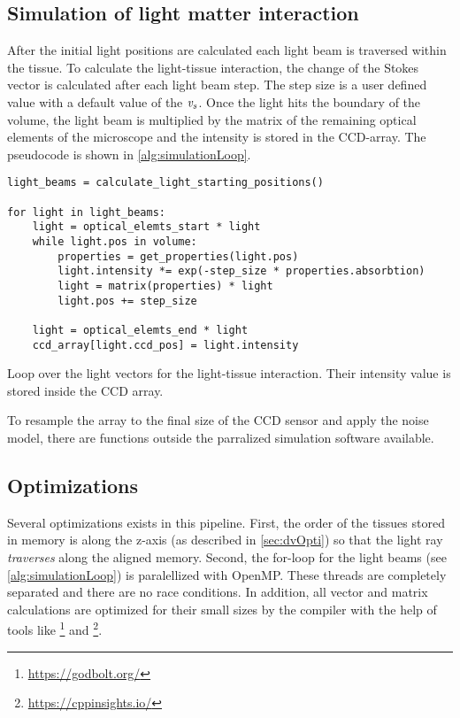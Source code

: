 \subsection{Simulation of light matter interaction}\label{sec:simLightTissue}
%
After the initial light positions are calculated each light beam is traversed within the tissue.
To calculate the light-tissue interaction, the change of the Stokes vector is calculated after each light beam step.
The step size is a user defined value with a default value of the \Voxelsize{} $\textnormal{$\mathit{v_{s}}$}$.
Once the light hits the boundary of the volume, the light beam is multiplied by the matrix of the remaining optical elements of the microscope and the intensity is stored in the \ac{CCD}-array.
The pseudocode is shown in \cref{alg:simulationLoop}.
%
\begin{lstfloat}[!tb]
\lstset{style=python}
\begin{lstlisting}[]
light_beams = calculate_light_starting_positions()

for light in light_beams:
    light = optical_elemts_start * light
    while light.pos in volume:
        properties = get_properties(light.pos)
        light.intensity *= exp(-step_size * properties.absorbtion)
        light = matrix(properties) * light
        light.pos += step_size
   
    light = optical_elemts_end * light
    ccd_array[light.ccd_pos] = light.intensity
\end{lstlisting}
\caption{Loop over the light vectors for the light-tissue interaction. Their intensity value is stored inside the \ac{CCD} array.}
\label{alg:simulationLoop}
\end{lstfloat}
%
To resample the array to the final size of the \ac{CCD} sensor and apply the noise model, there are \python{} functions outside the parralized simulation software available.
% 
% 
%
\subsection{Optimizations}
%
Several optimizations exists in this pipeline.
First, the order of the tissues stored in memory is along the z-axis (as described in \cref{sec:dvOpti}) so that the light ray \textit{traverses} along the aligned memory.
Second, the for-loop for the light beams (see \cref{alg:simulationLoop}) is paralellized with \ac{OpenMP}.
These threads are completely separated and there are no race conditions.
In addition, all vector and matrix calculations are optimized for their small sizes by the compiler with the help of tools like \footnote{\url{https://godbolt.org/}} and \footnote{\url{https://cppinsights.io/}}.
%
%
